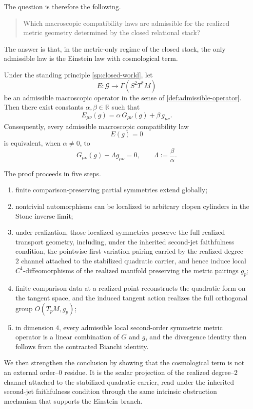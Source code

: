The question is therefore the following.
\begin{quote}
	Which macroscopic compatibility laws are admissible for the realized
	metric geometry determined by the closed relational stack?
\end{quote}
The answer is that, in the metric-only regime of the closed stack, the
only admissible law is the Einstein law with cosmological term.
\begin{theorem}
	\label{thm:einstein-main}
	Under the standing principle \cref{sp:closed-world}, let
	\[
		E:\mathcal G\to \Gamma(S^2T^*M)
	\]
	be an admissible macroscopic operator in the sense of
	\cref{def:admissible-operator}.
	Then there exist constants \(\alpha,\beta\in\mathbb R\) such that
	\[
		E_{\mu\nu}(g)=\alpha\,G_{\mu\nu}(g)+\beta\,g_{\mu\nu}.
	\]
	Consequently, every admissible macroscopic compatibility law
	\[
		E(g)=0
	\]
	is equivalent, when \(\alpha\neq 0\), to
	\[
		G_{\mu\nu}(g)+\Lambda g_{\mu\nu}=0,
		\qquad
		\Lambda:=\frac{\beta}{\alpha}.
	\]
\end{theorem}
The proof proceeds in five steps.
\begin{enumerate}[label=\textup{(\roman*)}]
	\item finite comparison-preserving partial symmetries extend globally;
	\item nontrivial automorphisms can be localized to arbitrary clopen
	      cylinders in the Stone inverse limit;
	\item under realization, those localized symmetries preserve the full
	      realized transport geometry, including, under the inherited
	      second-jet faithfulness condition, the pointwise first-variation
	      pairing carried by the realized degree--\(2\) channel attached
	      to the stabilized quadratic carrier, and hence induce local
	      \(C^1\)-diffeomorphisms of the realized manifold preserving the
	      metric pairings \(g_p\);
	\item finite comparison data at a realized point reconstructs the
	      quadratic form on the tangent space, and the induced tangent action
	      realizes the full orthogonal group \(O(T_pM,g_p)\);
	\item in dimension \(4\), every admissible local second-order symmetric
	      metric operator is a linear combination of \(G\) and \(g\), and the
	      divergence identity then follows from the contracted Bianchi identity.
\end{enumerate}
We then strengthen the conclusion by showing that the cosmological term
is not an external order--\(0\) residue.
It is the scalar projection of the realized degree--\(2\) channel
attached to the stabilized quadratic carrier, read under the
inherited second-jet faithfulness condition through the same
intrinsic obstruction mechanism that supports the Einstein branch.

